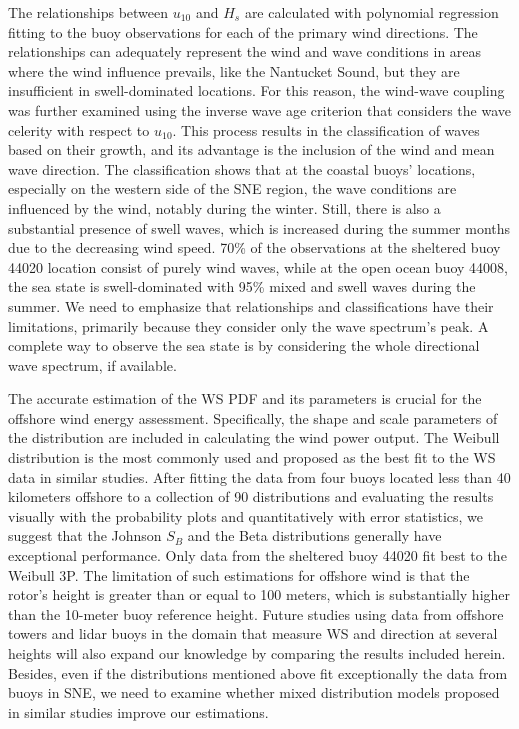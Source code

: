 The relationships between $u_{10}$ and $H_{s}$ are calculated with polynomial regression fitting to the buoy observations for each of the primary wind directions. The relationships can adequately represent the wind and wave conditions in areas where the wind influence prevails, like the Nantucket Sound, but they are insufficient in swell-dominated locations. For this reason, the wind-wave coupling was further examined using the inverse wave age criterion that considers the wave celerity with respect to $u_{10}$. This process results in the classification of waves based on their growth, and its advantage is the inclusion of the wind and mean wave direction. The classification shows that at the coastal buoys’ locations, especially on the western side of the SNE region, the wave conditions are influenced by the wind, notably during the winter. Still, there is also a substantial presence of swell waves, which is increased during the summer months due to the decreasing wind speed. 70\% of the observations at the sheltered buoy 44020 location consist of purely wind waves, while at the open ocean buoy 44008, the sea state is swell-dominated with 95\% mixed and swell waves during the summer. We need to emphasize that relationships and classifications have their limitations, primarily because they consider only the wave spectrum's peak. A complete way to observe the sea state is by considering the whole directional wave spectrum, if available.

The accurate estimation of the WS PDF and its parameters is crucial for the offshore wind energy assessment. Specifically, the shape and scale parameters of the distribution are included in calculating the wind power output. The Weibull distribution is the most commonly used and proposed as the best fit to the WS data in similar studies. After fitting the data from four buoys located less than 40 kilometers offshore to a collection of 90 distributions and evaluating the results visually with the probability plots and quantitatively with error statistics, we suggest that the Johnson $S_{B}$ and the Beta distributions generally have exceptional performance. Only data from the sheltered buoy 44020 fit best to the Weibull 3P. The limitation of such estimations for offshore wind is that the rotor's height is greater than or equal to 100 meters, which is substantially higher than the 10-meter buoy reference height. Future studies using data from offshore towers and lidar buoys in the domain that measure WS and direction at several heights will also expand our knowledge by comparing the results included herein. Besides, even if the distributions mentioned above fit exceptionally the data from buoys in SNE, we need to examine whether mixed distribution models proposed in similar studies \cite{Morgan2011} improve our estimations.

